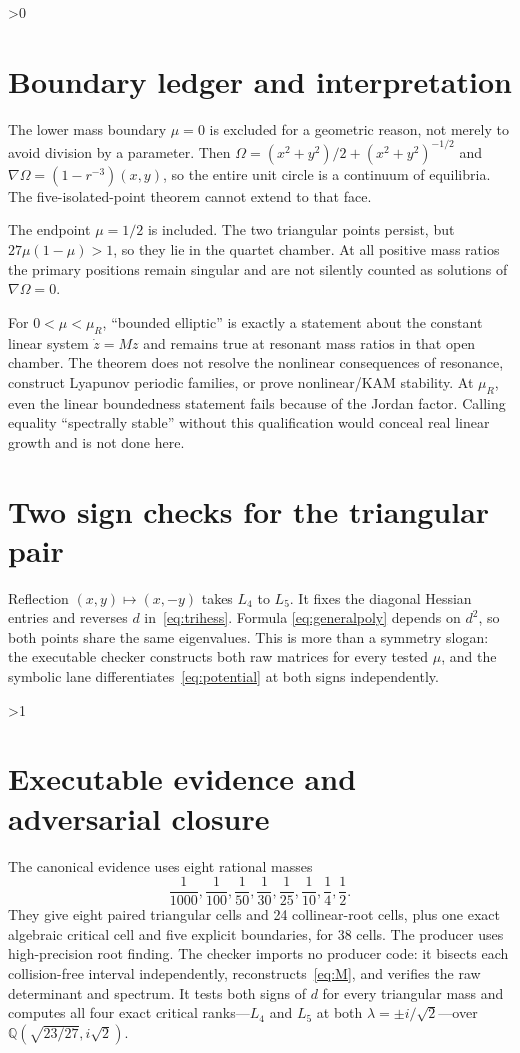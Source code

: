 \documentclass[10pt]{article}
\providecommand{\CRevisionRound}{2}
\newcommand{\Om}{\Omega}
\begin{document}
\ifnum\CRevisionRound>0
\section{Boundary ledger and interpretation}
The lower mass boundary $\mu=0$ is excluded for a geometric reason, not
merely to avoid division by a parameter.  Then
$\Om=(x^2+y^2)/2+(x^2+y^2)^{-1/2}$ and
$\nabla\Om=(1-r^{-3})(x,y)$, so the entire unit circle is a continuum of
equilibria.  The five-isolated-point theorem cannot extend to that face.

The endpoint $\mu=1/2$ is included.  The two triangular points persist, but
$27\mu(1-\mu)>1$, so they lie in the quartet chamber.  At all positive mass
ratios the primary positions remain singular and are not silently counted as
solutions of $\nabla\Om=0$.

For $0<\mu<\mu_R$, ``bounded elliptic'' is exactly a statement about the
constant linear system $\dot z=Mz$ and remains true at resonant mass ratios in
that open chamber.  The theorem does not resolve the nonlinear consequences
of resonance, construct Lyapunov periodic families, or prove nonlinear/KAM
stability.  At $\mu_R$, even the linear boundedness statement fails because
of the Jordan factor.  Calling equality ``spectrally stable'' without this
qualification would conceal real linear growth and is not done here.

\section{Two sign checks for the triangular pair}
Reflection $(x,y)\mapsto(x,-y)$ takes $L_4$ to $L_5$.  It fixes the diagonal
Hessian entries and reverses $d$ in~\eqref{eq:trihess}.  Formula
\eqref{eq:generalpoly} depends on $d^2$, so both points share the same
eigenvalues.  This is more than a symmetry slogan: the executable checker
constructs both raw matrices for every tested $\mu$, and the symbolic lane
differentiates~\eqref{eq:potential} at both signs independently.
\fi

\ifnum\CRevisionRound>1
\section{Executable evidence and adversarial closure}
The canonical evidence uses eight rational masses
\[
 \frac1{1000},\frac1{100},\frac1{50},\frac1{30},
 \frac1{25},\frac1{10},\frac14,\frac12.
\]
They give eight paired triangular cells and 24 collinear-root cells, plus one
exact algebraic critical cell and five explicit boundaries, for 38 cells.
The producer uses high-precision root finding.  The checker imports no
producer code: it bisects each collision-free interval independently,
reconstructs~\eqref{eq:M}, and verifies the raw determinant and spectrum.  It
tests both signs of $d$ for every triangular mass and computes all four exact
critical ranks---$L_4$ and $L_5$ at both $\lambda=\pm i/\sqrt2$---over
$\mathbb Q(\sqrt{23/27},i\sqrt2)$.
\end{document}

